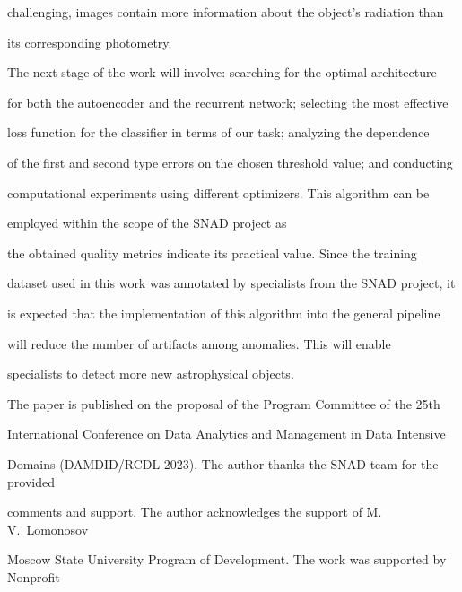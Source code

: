 challenging, images contain more information about the object's radiation than 

its corresponding photometry.





The next stage of the work will involve: searching for the optimal architecture 

for both the autoencoder and the recurrent network; selecting the most effective 

loss function for the classifier in terms of our task; analyzing the dependence 

of the first and second type errors on the chosen threshold value; and conducting 

computational experiments using different optimizers. This algorithm can be 

employed within the scope of the SNAD project as 

the obtained quality metrics indicate its practical value. Since the training 

dataset used in this work was annotated by specialists from the SNAD project, it 

is expected that the implementation of this algorithm into the general pipeline 

will reduce the number of artifacts among anomalies. This will enable 

specialists to detect more new astrophysical objects.











\Ack



\vspace*{-3pt}



\noindent

The paper is published on the proposal of the Program Committee of the 25th 

International Conference on Data Analytics and Management in Data Intensive 

Domains (DAMDID/RCDL 2023). The author thanks the SNAD team for the provided 

comments and support. The author acknowledges the support of M.\,V.~Lomonosov 

Moscow State University Program of Development. The work was supported by Nonprofit 

